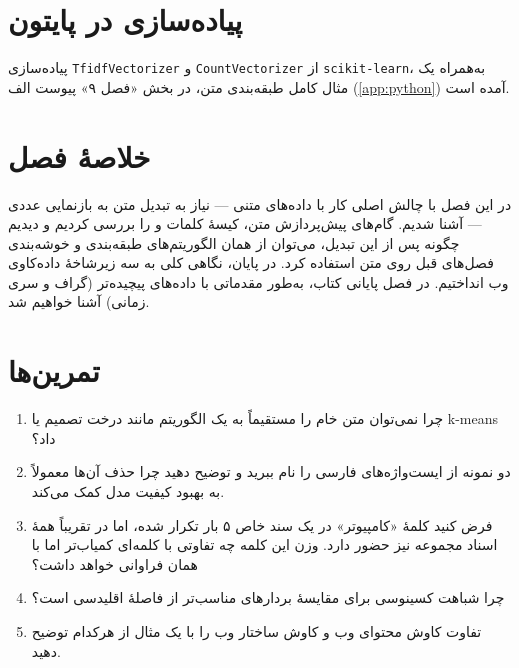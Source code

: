 \section*{پیاده‌سازی در پایتون}

پیاده‌سازی \texttt{TfidfVectorizer} و \texttt{CountVectorizer} از
\texttt{scikit-learn}، به‌همراه یک مثال کامل طبقه‌بندی متن، در بخش
«فصل ۹» پیوست الف (\ref{app:python}) آمده است.

\section*{خلاصهٔ فصل}

در این فصل با چالش اصلی کار با داده‌های متنی — نیاز به تبدیل متن به
بازنمایی عددی — آشنا شدیم. گام‌های پیش‌پردازش متن، کیسهٔ کلمات و
 را بررسی کردیم و دیدیم چگونه پس از این تبدیل، می‌توان از
همان الگوریتم‌های طبقه‌بندی و خوشه‌بندی فصل‌های قبل روی متن استفاده
کرد. در پایان، نگاهی کلی به سه زیرشاخهٔ داده‌کاوی وب انداختیم. در فصل
پایانی کتاب، به‌طور مقدماتی با داده‌های پیچیده‌تر (گراف و سری زمانی)
آشنا خواهیم شد.

\section*{تمرین‌ها}

\begin{enumerate}
    \item چرا نمی‌توان متن خام را مستقیماً به یک الگوریتم مانند درخت
          تصمیم یا k-means داد؟
    \item دو نمونه از ایست‌واژه‌های فارسی را نام ببرید و توضیح دهید چرا
          حذف آن‌ها معمولاً به بهبود کیفیت مدل کمک می‌کند.
    \item فرض کنید کلمهٔ «کامپیوتر» در یک سند خاص ۵ بار تکرار شده، اما
          در تقریباً همهٔ اسناد مجموعه نیز حضور دارد. وزن 
          این کلمه چه تفاوتی با کلمه‌ای کمیاب‌تر اما با همان فراوانی
          خواهد داشت؟
    \item چرا شباهت کسینوسی برای مقایسهٔ بردارهای  مناسب‌تر
          از فاصلهٔ اقلیدسی است؟
    \item تفاوت کاوش محتوای وب و کاوش ساختار وب را با یک مثال از هرکدام
          توضیح دهید.
\end{enumerate}
